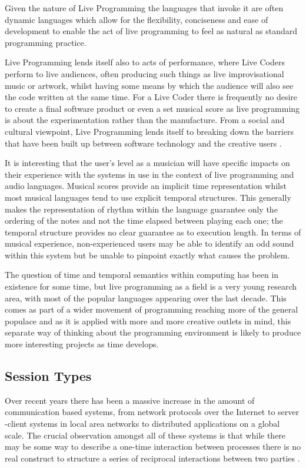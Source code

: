 \documentclass[11pt]{scrartcl}
\begin{document}
Given the nature of Live Programming the languages that invoke it are often 
dynamic languages which allow for the flexibility, conciseness and ease of 
development \cite{McD07} to enable the act of live programming to feel as 
natural as standard programming practice.

Live Programming lends itself also to acts of performance, where Live Coders 
perform to live audiences, often producing such things as live 
improvisational music or artwork, whilst having some means by which the 
audience will also see the code written at the same time. For a Live Coder 
there is frequently no desire to create a final software product or even a set 
musical score as live programming is about the experimentation rather than the 
manufacture. From a social and cultural viewpoint, Live Programming lends 
itself to breaking down the barriers that have been built up between software 
technology and the creative users \cite{McL13}.

It is interesting that the user's level as a musician will have specific 
impacts on their experience with the systems in use in the context of live 
programming and audio languages. Musical scores provide an implicit time 
representation whilst most musical languages tend to use explicit temporal 
structures. This generally makes the representation of rhythm within the 
language guarantee only the ordering of the notes and not the time elapsed 
between playing each one; the temporal structure provides no clear guarantee as 
to execution length. In terms of musical experience, non-experienced 
users may be able to identify an odd sound within this system but be unable to 
pinpoint exactly what causes the problem. 

The question of time and temporal semantics within computing has been in 
existence for some time, but live programming as a field is a very young 
research area, with most of the popular languages appearing over the last 
decade. This comes as part of a wider movement of programming reaching more of 
the general populace and as it is applied with more and more creative outlets 
in mind, this separate way of thinking about the programming environment is 
likely to produce more interesting projects as time develops. 

\subsection{Session Types}
Over recent years there has been a massive increase in the amount of 
communication based systems, from network protocols over the Internet to server
-client systems in local area networks to distributed applications on a global 
scale. The crucial observation amongst all of these systems is that while 
there may be some way to describe a one-time interaction between processes 
there is no real construct to structure a series of reciprocal interactions 
between two parties \cite{HVM98}.
\end{document}
